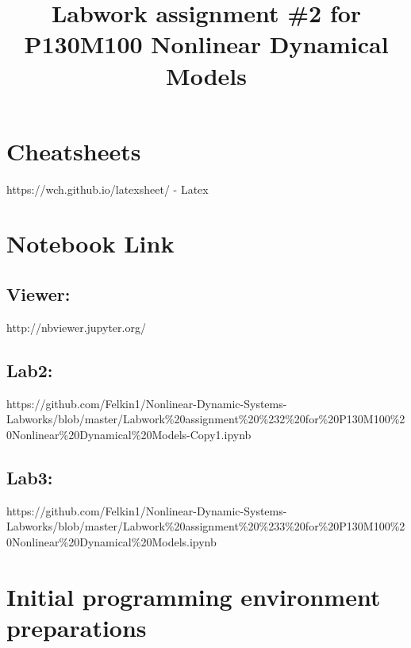 \documentclass[11pt]{article}
\title{Labwork assignment \#2 for P130M100 Nonlinear Dynamical Models}
\begin{document}
    
    
    \maketitle
    
    

    
    \hypertarget{cheatsheets}{%
\section{Cheatsheets}\label{cheatsheets}}

https://wch.github.io/latexsheet/ - Latex

    \hypertarget{notebook-link}{%
\section{Notebook Link}\label{notebook-link}}

\hypertarget{viewer}{%
\subsection{Viewer:}\label{viewer}}

http://nbviewer.jupyter.org/

\hypertarget{lab2}{%
\subsection{Lab2:}\label{lab2}}

https://github.com/Felkin1/Nonlinear-Dynamic-Systems-Labworks/blob/master/Labwork\%20assignment\%20\%232\%20for\%20P130M100\%20Nonlinear\%20Dynamical\%20Models-Copy1.ipynb

\hypertarget{lab3}{%
\subsection{Lab3:}\label{lab3}}

https://github.com/Felkin1/Nonlinear-Dynamic-Systems-Labworks/blob/master/Labwork\%20assignment\%20\%233\%20for\%20P130M100\%20Nonlinear\%20Dynamical\%20Models.ipynb

    \hypertarget{initial-programming-environment-preparations}{%
\section{Initial programming environment
preparations}\label{initial-programming-environment-preparations}}
\end{document}
